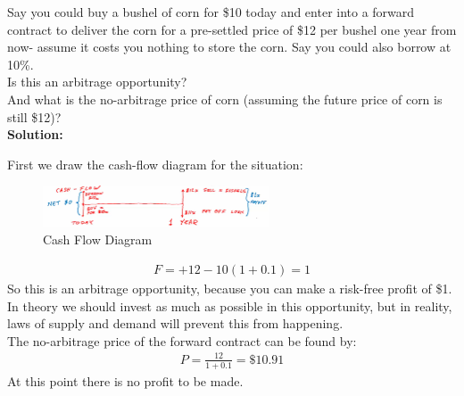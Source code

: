 \begin{example}
    Say you could buy a bushel of corn for \$10 today and enter into a forward contract to deliver the corn for a pre-settled price of \$12 per bushel one year from now- assume it costs you nothing to store the corn. Say you could also borrow at 10\%.\\
    Is this an arbitrage opportunity?\\
    And what is the no-arbitrage price of corn (assuming the future price of corn is still \$12)?\\

    \textbf{Solution:}

    First we draw the cash-flow diagram for the situation:
    \begin{figure}[h!]
        \centering
        \includegraphics[width=0.6\textwidth]{LECTURE_4/cash-flow-2.png}
        \caption{Cash Flow Diagram}
        \label{fig:cash_flow_diagram_2}
    \end{figure}

    \begin{align*}
        F = +12 - 10(1+0.1) = 1
    \end{align*}
    So this is an arbitrage opportunity, because you can make a risk-free profit of \$1. In theory we should invest as much as possible in this opportunity, but in reality, laws of supply and demand will prevent this from happening.\\
    The no-arbitrage price of the forward contract can be found by:
    \begin{align*}
        P = \frac{12}{1+0.1} = \$10.91
    \end{align*}
    At this point there is no profit to be made.
\end{example}

